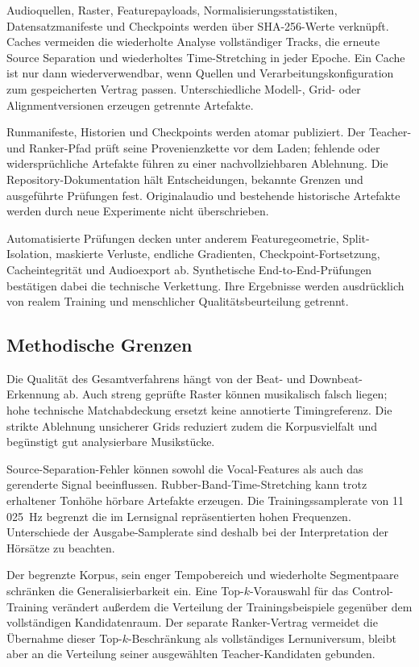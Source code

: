 Audioquellen, Raster, Featurepayloads, Normalisierungsstatistiken, Datensatzmanifeste und Checkpoints werden über SHA-256-Werte verknüpft. Caches vermeiden die wiederholte Analyse vollständiger Tracks, die erneute Source Separation und wiederholtes Time-Stretching in jeder Epoche. Ein Cache ist nur dann wiederverwendbar, wenn Quellen und Verarbeitungskonfiguration zum gespeicherten Vertrag passen. Unterschiedliche Modell-, Grid- oder Alignmentversionen erzeugen getrennte Artefakte.

Runmanifeste, Historien und Checkpoints werden atomar publiziert. Der Teacher- und Ranker-Pfad prüft seine Provenienzkette vor dem Laden; fehlende oder widersprüchliche Artefakte führen zu einer nachvollziehbaren Ablehnung. Die Repository-Dokumentation hält Entscheidungen, bekannte Grenzen und ausgeführte Prüfungen fest. Originalaudio und bestehende historische Artefakte werden durch neue Experimente nicht überschrieben.

Automatisierte Prüfungen decken unter anderem Featuregeometrie, Split-Isolation, maskierte Verluste, endliche Gradienten, Checkpoint-Fortsetzung, Cacheintegrität und Audioexport ab. Synthetische End-to-End-Prüfungen bestätigen dabei die technische Verkettung. Ihre Ergebnisse werden ausdrücklich von realem Training und menschlicher Qualitätsbeurteilung getrennt.

\subsection{Methodische Grenzen}
\label{sec:methodik-grenzen}

Die Qualität des Gesamtverfahrens hängt von der Beat- und Downbeat-Erkennung ab. Auch streng geprüfte Raster können musikalisch falsch liegen; hohe technische Matchabdeckung ersetzt keine annotierte Timingreferenz. Die strikte Ablehnung unsicherer Grids reduziert zudem die Korpusvielfalt und begünstigt gut analysierbare Musikstücke.

Source-Separation-Fehler können sowohl die Vocal-Features als auch das gerenderte Signal beeinflussen. Rubber-Band-Time-Stretching kann trotz erhaltener Tonhöhe hörbare Artefakte erzeugen. Die Trainingssamplerate von 11\,025~Hz begrenzt die im Lernsignal repräsentierten hohen Frequenzen. Unterschiede der Ausgabe-Samplerate sind deshalb bei der Interpretation der Hörsätze zu beachten.

Der begrenzte Korpus, sein enger Tempobereich und wiederholte Segmentpaare schränken die Generalisierbarkeit ein. Eine Top-$k$-Vorauswahl für das Control-Training verändert außerdem die Verteilung der Trainingsbeispiele gegenüber dem vollständigen Kandidatenraum. Der separate Ranker-Vertrag vermeidet die Übernahme dieser Top-$k$-Beschränkung als vollständiges Lernuniversum, bleibt aber an die Verteilung seiner ausgewählten Teacher-Kandidaten gebunden.

